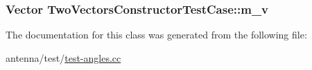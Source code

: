 \subsubsection[{\texorpdfstring{m\+\_\+v}{m_v}}]{\setlength{\rightskip}{0pt plus 5cm}Vector Two\+Vectors\+Constructor\+Test\+Case\+::m\+\_\+v\hspace{0.3cm}{\ttfamily [private]}}\hypertarget{classTwoVectorsConstructorTestCase_a18c0da207aedfe832db0d738f29754f4}{}\label{classTwoVectorsConstructorTestCase_a18c0da207aedfe832db0d738f29754f4}


The documentation for this class was generated from the following file\+:\begin{DoxyCompactItemize}
\item 
antenna/test/\hyperlink{test-angles_8cc}{test-\/angles.\+cc}\end{DoxyCompactItemize}
